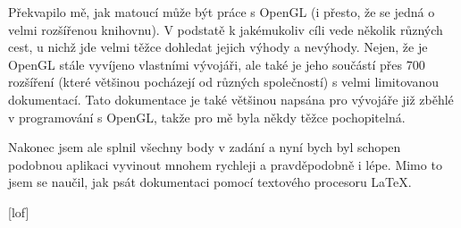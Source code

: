 \documentclass[a4paper, 11pt]{report}
\begin{document}
Překvapilo mě, jak matoucí může být práce s OpenGL (i přesto, že se jedná o velmi rozšířenou knihovnu). V podstatě k jakémukoliv cíli vede několik různých cest, u nichž jde velmi těžce dohledat jejich výhody a nevýhody. Nejen, že je OpenGL stále vyvíjeno vlastními vývojáři, ale také je jeho součástí přes 700 rozšíření (které většinou pocházejí od různých společností) s velmi limitovanou dokumentací. Tato dokumentace je také většinou napsána pro vývojáře již zběhlé v programování s OpenGL, takže pro mě byla někdy těžce pochopitelná.

Nakonec jsem ale splnil všechny body v zadání a nyní bych byl schopen podobnou aplikaci vyvinout mnohem rychleji a pravděpodobně i lépe. Mimo to jsem se naučil, jak psát dokumentaci pomocí textového procesoru \LaTeX.

\renewcommand{\bibpreamble}{%
This software is based in part on the work of the Independent JPEG Group.
}

\begin{flushleft}
    \makeatletter
        
        
    \makeatother
\end{flushleft}

\clearpage
{
    \pagestyle{lof}
    [lof]{}
    \listoffigures
    \thispagestyle{lof}
}
\end{document}
